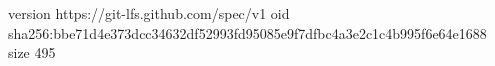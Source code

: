 version https://git-lfs.github.com/spec/v1
oid sha256:bbe71d4e373dcc34632df52993fd95085e9f7dfbc4a3e2c1c4b995f6e64e1688
size 495
